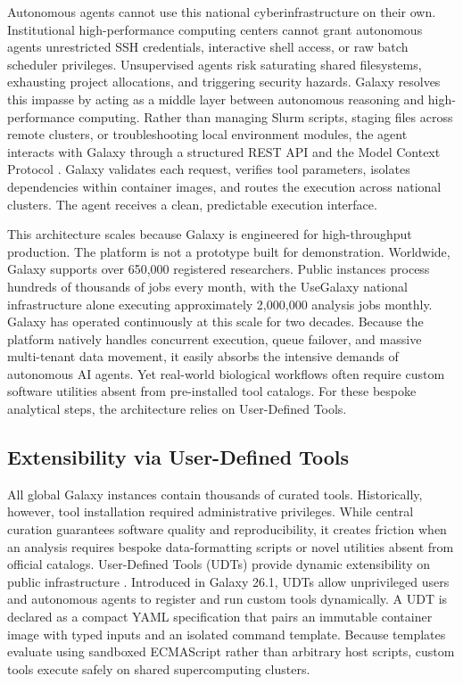 \documentclass[11pt,letterpaper]{article}
\begin{document}
Autonomous agents cannot use this national cyberinfrastructure on their own. Institutional high-performance computing centers cannot grant autonomous agents unrestricted SSH credentials, interactive shell access, or raw batch scheduler privileges. Unsupervised agents risk saturating shared filesystems, exhausting project allocations, and triggering security hazards. Galaxy resolves this impasse by acting as a middle layer between autonomous reasoning and high-performance computing. Rather than managing Slurm scripts, staging files across remote clusters, or troubleshooting local environment modules, the agent interacts with Galaxy through a structured REST API and the Model Context Protocol \cite{galaxymcp2026}. Galaxy validates each request, verifies tool parameters, isolates dependencies within container images, and routes the execution across national clusters. The agent receives a clean, predictable execution interface.

This architecture scales because Galaxy is engineered for high-throughput production. The platform is not a prototype built for demonstration. Worldwide, Galaxy supports over 650,000 registered researchers. Public instances process hundreds of thousands of jobs every month, with the UseGalaxy national infrastructure alone executing approximately 2,000,000 analysis jobs monthly. Galaxy has operated continuously at this scale for two decades. Because the platform natively handles concurrent execution, queue failover, and massive multi-tenant data movement, it easily absorbs the intensive demands of autonomous AI agents. Yet real-world biological workflows often require custom software utilities absent from pre-installed tool catalogs. For these bespoke analytical steps, the architecture relies on User-Defined Tools.

\subsection{Extensibility via User-Defined Tools}

All global Galaxy instances contain thousands of curated tools. Historically, however, tool installation required administrative privileges. While central curation guarantees software quality and reproducibility, it creates friction when an analysis requires bespoke data-formatting scripts or novel utilities absent from official catalogs. User-Defined Tools (UDTs) provide dynamic extensibility on public infrastructure \cite{galaxyudt2026}. Introduced in Galaxy 26.1, UDTs allow unprivileged users and autonomous agents to register and run custom tools dynamically. A UDT is declared as a compact YAML specification that pairs an immutable container image with typed inputs and an isolated command template. Because templates evaluate using sandboxed ECMAScript rather than arbitrary host scripts, custom tools execute safely on shared supercomputing clusters.
\end{document}
